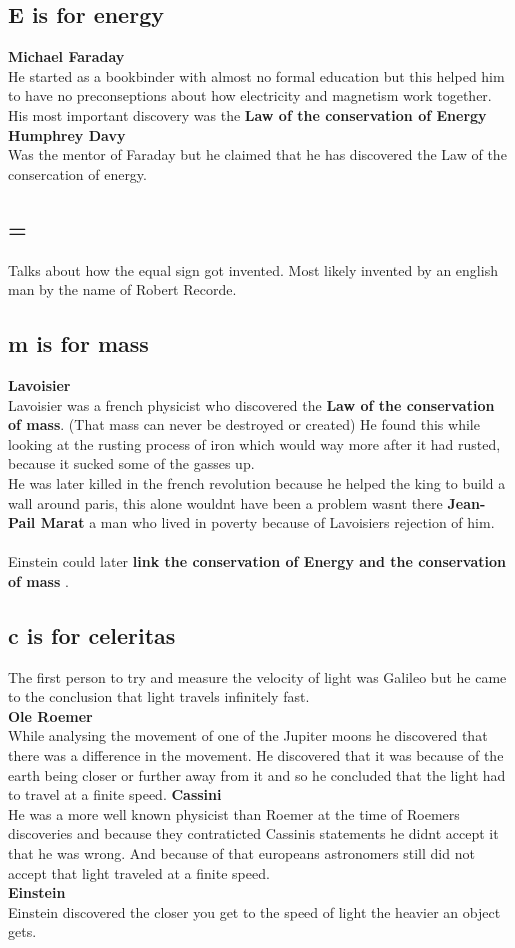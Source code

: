 \documentclass{article}
\begin{document}
\subsection{E is for energy}
\textbf{Michael Faraday}\\
He started as a bookbinder with almost no formal education but this helped him to have no preconseptions about how electricity and magnetism work together. \\
His most important discovery was the \textbf{Law of the conservation of Energy}\\

\textbf{Humphrey Davy} \\
Was the mentor of Faraday but he claimed that he has discovered the Law of the consercation of energy.
\subsection{=}
Talks about how the equal sign got invented. Most likely invented by an english man by the name of Robert Recorde.
\subsection{m is for mass}
\textbf{Lavoisier} \\
Lavoisier was a french physicist who discovered the \textbf{Law of the conservation of mass}. (That mass can never be destroyed or created) He found this while looking at the rusting process of iron which would way more after it had rusted, because it sucked some of the gasses up. \\
He was later killed in the french revolution because he helped the king to build a wall around paris, this alone wouldnt have been a problem wasnt there \textbf{Jean-Pail Marat} a man who lived in poverty because of Lavoisiers rejection of him. \\
\\
Einstein could later \textbf{link the conservation of Energy and the conservation of mass} .
\subsection{c is for celeritas}
The first person to try and measure the velocity of light was Galileo but he came to the conclusion that light travels infinitely fast.\\
\textbf{Ole Roemer} \\
While analysing the movement of one of the Jupiter moons he discovered that there was a difference in the movement. He discovered that it was because of the earth being closer or further away from it and so he concluded that the light had to travel at a finite speed. 
\textbf{Cassini}\\
He was a more well known physicist than Roemer at the time of Roemers discoveries and because they contraticted Cassinis statements he didnt accept it that he was wrong. And because of that europeans astronomers still did not accept that light traveled at a finite speed. \\
\textbf{Einstein} \\
Einstein discovered the closer you get to the speed of light the heavier an object gets.
\end{document}
